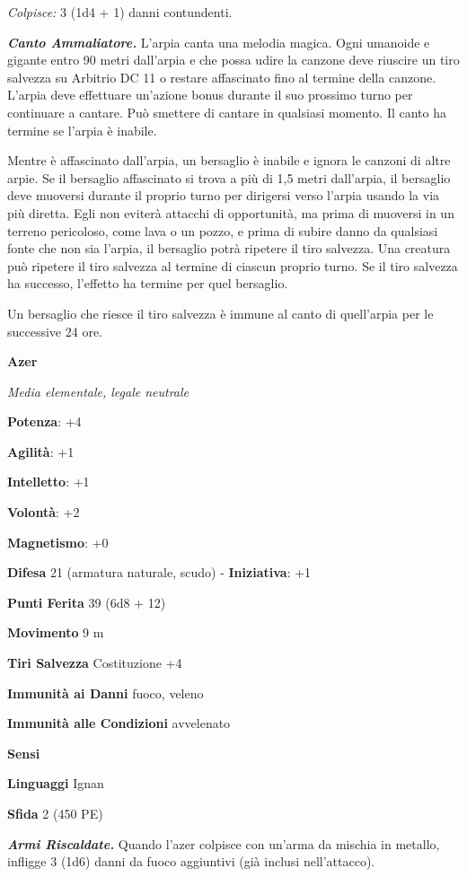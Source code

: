 \begin{multicols}{2}
\emph{Colpisce:} 3 (1d4 + 1) danni contundenti.

\emph{\textbf{Canto Ammaliatore.}} L'arpia canta una melodia magica.
Ogni umanoide e gigante entro 90 metri dall'arpia e che possa udire la
canzone deve riuscire un tiro salvezza su Arbitrio DC 11 o restare
affascinato fino al termine della canzone. L'arpia deve effettuare
un'azione bonus durante il suo prossimo turno per continuare a cantare.
Può smettere di cantare in qualsiasi momento. Il canto ha termine se
l'arpia è inabile.

Mentre è affascinato dall'arpia, un bersaglio è inabile e ignora le
canzoni di altre arpie. Se il bersaglio affascinato si trova a più di
1,5 metri dall'arpia, il bersaglio deve muoversi durante il proprio
turno per dirigersi verso l'arpia usando la via più diretta. Egli non
eviterà attacchi di opportunità, ma prima di muoversi in un terreno
pericoloso, come lava o un pozzo, e prima di subire danno da qualsiasi
fonte che non sia l'arpia, il bersaglio potrà ripetere il tiro salvezza.
Una creatura può ripetere il tiro salvezza al termine di ciascun proprio
turno. Se il tiro salvezza ha successo, l'effetto ha termine per quel
bersaglio.

Un bersaglio che riesce il tiro salvezza è immune al canto di
quell'arpia per le successive 24 ore.

\textbf{Azer}

\emph{Media elementale, legale neutrale}

\textbf{Potenza}: +4

\textbf{Agilità}: +1

\textbf{Intelletto}: +1

\textbf{Volontà}: +2

\textbf{Magnetismo}: +0

\textbf{Difesa} 21 (armatura naturale, scudo) - \textbf{Iniziativa}: +1

\textbf{Punti Ferita} 39 (6d8 + 12)

\textbf{Movimento} 9 m

\textbf{Tiri Salvezza} Costituzione +4

\textbf{Immunità ai Danni} fuoco, veleno

\textbf{Immunità alle Condizioni} avvelenato

\textbf{Sensi} 

\textbf{Linguaggi} Ignan

\textbf{Sfida} 2 (450 PE)

\emph{\textbf{Armi Riscaldate.}} Quando l'azer colpisce con un'arma da
mischia in metallo, infligge 3 (1d6) danni da fuoco aggiuntivi (già
inclusi nell'attacco).


\end{multicols}
